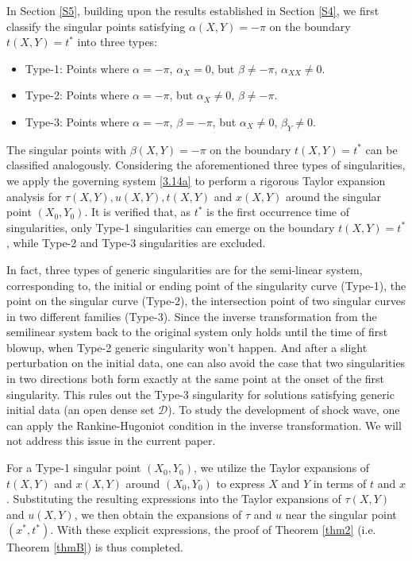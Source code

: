 \documentclass[11pt,reqno]{article}
\numberwithin{equation}{section}
\begin{document}
In Section \ref{S5}, building upon the results established in Section \ref{S4}, we first classify the singular points satisfying $\alpha(X,Y)=-\pi$ on the boundary $t(X,Y)=t^*$ into three types:
\begin{itemize}

\item[] Type-1: Points where $\alpha=-\pi$, $\alpha_X= 0$, but $\beta\neq-\pi$, $\alpha_{XX}\neq0$.

\item[] Type-2: Points where $\alpha=-\pi$, but $\alpha_X\neq 0$, $\beta\neq-\pi$.

\item[] Type-3: Points where $\alpha=-\pi$, $\beta= -\pi$, but $\alpha_X\neq 0$, $\beta_Y\neq0$.

\end{itemize}
The singular points with $\beta(X,Y)=-\pi$ on the boundary $t(X,Y)=t^*$ can be classified analogously. Considering the aforementioned three types of singularities, we apply the governing system \eqref{3.14a} to perform a rigorous Taylor expansion analysis for $\tau(X,Y), u(X,Y), t(X,Y)$ and $x(X,Y)$ around the singular point $(X_0, Y_0)$. It is verified that, as
$t^*$ is the first occurrence time of singularities, only Type-1 singularities can emerge
on the boundary $t(X,Y)=t^*$, while Type-2 and Type-3 singularities are excluded.

In fact, three types of generic singularities are for the semi-linear system, corresponding to, the initial or ending point of the singularity curve (Type-1), the point on the singular curve (Type-2), the intersection point of two singular curves in two different families (Type-3).
Since the inverse transformation from the semilinear system
back to the original system only holds until the time of first blowup, when Type-2 generic
singularity won't happen.
And after a slight perturbation on the initial data, one can also avoid the case that two singularities in two directions both form exactly at the same point at the onset of the first singularity. This rules out the Type-3 singularity for solutions satisfying generic initial data (an open dense set $\mathcal{D}$). To study the development of shock wave, one can apply the Rankine-Hugoniot condition in the inverse transformation. We will not address this issue in the current paper.


For a Type-1 singular point $(X_0, Y_0)$, we utilize the Taylor expansions of $t(X,Y)$ and $x(X,Y)$ around $(X_0, Y_0)$ to express $X$ and $Y$ in terms of $t$ and $x$. Substituting the resulting expressions into the Taylor expansions of $\tau(X,Y)$ and $u(X,Y)$, we then obtain the expansions of $\tau$ and $u$ near the singular point $(x^*, t^*)$. With these explicit expressions, the proof of Theorem \ref{thm2} (i.e. Theorem \ref{thmB}) is thus completed.
\end{document}
